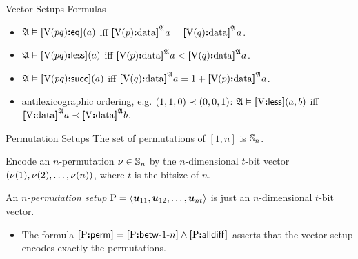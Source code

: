 \documentclass{beamer}
\begin{document}
\begin{frame}{Vector Setups Formulas}
\begin{itemize}
  \item
  $\StrA\vDash\feqP\VS\posp\posq(\ea)$ iff $\data{\VSp\posp}\StrA\ea =
  \data{\VSp\posq}\StrA\ea$.
  
  \item
  $\StrA\vDash\flessP\VS\posp\posq(\ea)$ iff $\data{\VSp\posp}\StrA\ea <
  \data{\VSp\posq}\StrA\ea$.
  
  \item
  $\StrA\vDash\fsuccP\VS\posp\posq(\ea)$ iff $\data{\VSp\posq}\StrA\ea =
  1 + \data{\VSp\posp}\StrA\ea$.
  
  \item
  antilexicographic ordering, e.g. $(1,1,0)\lexlt (0,0,1)$:
  $\StrA\vDash\fless\VS(\ea,\eb)$ iff
  $\data{\VS}\StrA\ea\lexlt\data{\VS}\StrA\eb$.
\end{itemize}
\end{frame}

\begin{frame}{Permutation Setups}
The set of permutations of $[1,n]$ is $\Perms\nn$.

Encode an $n$-permutation $\permnu\in\Perms\nn$ by the
$n$-dimensional $t$-bit vector $(\permnu(1), \permnu(2), \dots, \permnu(n))$,
where $t$ is the bitsize of $n$.

An \emph{$n$-permutation setup} $\PS =
\seq{\suu{11},\suu{12},\dots,\suu{nt}}$ is just an $n$-dimensional $t$-bit
vector.
\begin{itemize}
  
  \item The formula $\fperm\PS = \fbetw\PS1\nn \land \falldiff\PS$ asserts that
  the vector setup encodes exactly the permutations.
\end{itemize}
\end{frame}
\end{document}
